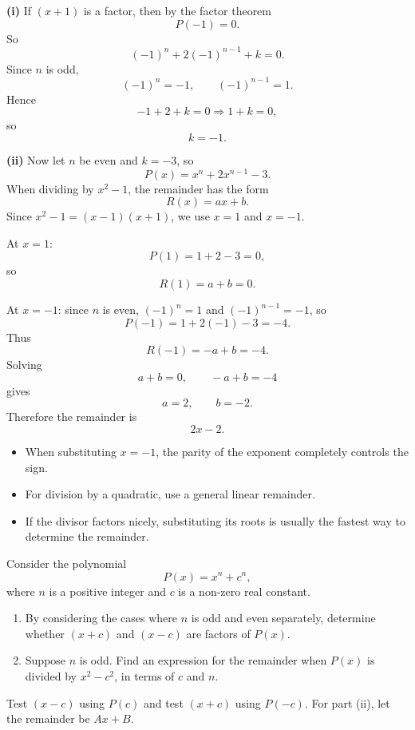 \begin{solution}
\textbf{(i)} If $(x+1)$ is a factor, then by the factor theorem
\[
P(-1)=0.
\]
So
\[
(-1)^n+2(-1)^{n-1}+k=0.
\]
Since $n$ is odd,
\[
(-1)^n=-1,\qquad (-1)^{n-1}=1.
\]
Hence
\[
-1+2+k=0 \Rightarrow 1+k=0,
\]
so
\[
\boxed{k=-1.}
\]

\textbf{(ii)} Now let $n$ be even and $k=-3$, so
\[
P(x)=x^n+2x^{n-1}-3.
\]
When dividing by $x^2-1$, the remainder has the form
\[
R(x)=ax+b.
\]
Since $x^2-1=(x-1)(x+1)$, we use $x=1$ and $x=-1$.

At $x=1$:
\[
P(1)=1+2-3=0,
\]
so
\[
R(1)=a+b=0.
\]

At $x=-1$: since $n$ is even, $(-1)^n=1$ and $(-1)^{n-1}=-1$, so
\[
P(-1)=1+2(-1)-3=-4.
\]
Thus
\[
R(-1)=-a+b=-4.
\]
Solving
\[
a+b=0,\qquad -a+b=-4
\]
gives
\[
a=2,\qquad b=-2.
\]
Therefore the remainder is
\[
\boxed{2x-2.}
\]
\end{solution}

\begin{takeaways}
\begin{itemize}[leftmargin=*]
\item When substituting $x=-1$, the parity of the exponent completely controls the sign.
\item For division by a quadratic, use a general linear remainder.
\item If the divisor factors nicely, substituting its roots is usually the fastest way to determine the remainder.
\end{itemize}
\end{takeaways}

\begin{problem}
Consider the polynomial
\[
P(x)=x^n+c^n,
\]
where $n$ is a positive integer and $c$ is a non-zero real constant.
\begin{enumerate}[label=(\roman*)]
\item By considering the cases where $n$ is odd and even separately, determine whether $(x+c)$ and $(x-c)$ are factors of $P(x)$.
\item Suppose $n$ is odd. Find an expression for the remainder when $P(x)$ is divided by $x^2-c^2$, in terms of $c$ and $n$.
\end{enumerate}
\end{problem}

\begin{hintbox}
Test $(x-c)$ using $P(c)$ and test $(x+c)$ using $P(-c)$. For part (ii), let the remainder be $Ax+B$.
\end{hintbox}


